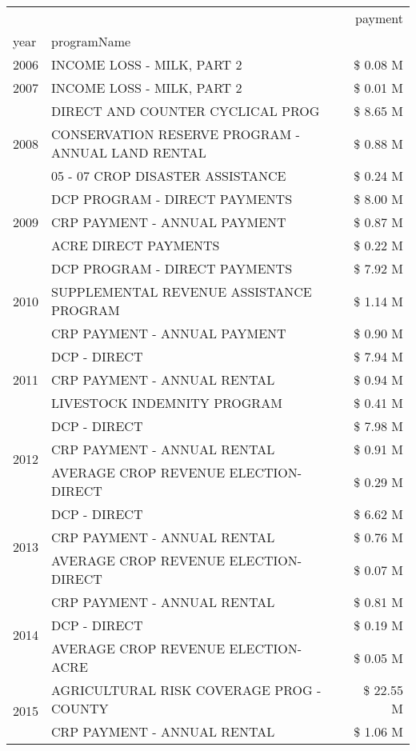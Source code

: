 \begin{tabular}{llr}
\toprule
 &  & payment \\
year & programName &  \\
\midrule
2006 & INCOME LOSS - MILK, PART 2 & \$ 0.08 M \\
\cline{1-3}
2007 & INCOME LOSS - MILK, PART 2 & \$ 0.01 M \\
\cline{1-3}
\multirow[t]{3}{*}{2008} & DIRECT AND COUNTER CYCLICAL PROG & \$ 8.65 M \\
 & CONSERVATION RESERVE PROGRAM - ANNUAL LAND RENTAL & \$ 0.88 M \\
 & 05 - 07 CROP DISASTER ASSISTANCE & \$ 0.24 M \\
\cline{1-3}
\multirow[t]{3}{*}{2009} & DCP PROGRAM - DIRECT PAYMENTS & \$ 8.00 M \\
 & CRP PAYMENT - ANNUAL PAYMENT & \$ 0.87 M \\
 & ACRE DIRECT PAYMENTS & \$ 0.22 M \\
\cline{1-3}
\multirow[t]{3}{*}{2010} & DCP PROGRAM - DIRECT PAYMENTS & \$ 7.92 M \\
 & SUPPLEMENTAL REVENUE ASSISTANCE PROGRAM & \$ 1.14 M \\
 & CRP PAYMENT - ANNUAL PAYMENT & \$ 0.90 M \\
\cline{1-3}
\multirow[t]{3}{*}{2011} & DCP - DIRECT & \$ 7.94 M \\
 & CRP PAYMENT - ANNUAL RENTAL & \$ 0.94 M \\
 & LIVESTOCK INDEMNITY PROGRAM & \$ 0.41 M \\
\cline{1-3}
\multirow[t]{3}{*}{2012} & DCP - DIRECT & \$ 7.98 M \\
 & CRP PAYMENT - ANNUAL RENTAL & \$ 0.91 M \\
 & AVERAGE CROP REVENUE ELECTION-DIRECT & \$ 0.29 M \\
\cline{1-3}
\multirow[t]{3}{*}{2013} & DCP - DIRECT & \$ 6.62 M \\
 & CRP PAYMENT - ANNUAL RENTAL & \$ 0.76 M \\
 & AVERAGE CROP REVENUE ELECTION-DIRECT & \$ 0.07 M \\
\cline{1-3}
\multirow[t]{3}{*}{2014} & CRP PAYMENT - ANNUAL RENTAL & \$ 0.81 M \\
 & DCP - DIRECT & \$ 0.19 M \\
 & AVERAGE CROP REVENUE ELECTION-ACRE & \$ 0.05 M \\
\cline{1-3}
\multirow[t]{3}{*}{2015} & AGRICULTURAL RISK COVERAGE PROG - COUNTY & \$ 22.55 M \\
 & CRP PAYMENT - ANNUAL RENTAL & \$ 1.06 M \\

\end{tabular}
